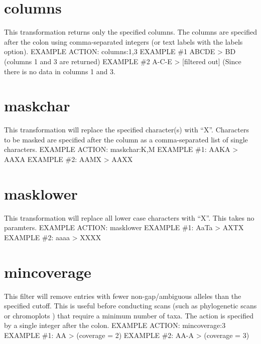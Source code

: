 \documentclass[letterpaper,11pt,english]{sphinxmanual}
\begin{document}
\section{columns}
\label{\detokenize{mvf_filter_modules:columns}}
This transformation returns only the specified columns.
The columns are specified after the colon using comma-separated integers
(or text labels with the \textendash{}labels option).
EXAMPLE ACTION: columns:1,3
EXAMPLE \#1 ABCDE \textendash{}\textgreater{} BD (columns 1 and 3 are returned)
EXAMPLE \#2 A-C-E \textendash{}\textgreater{} {[}filtered out{]} (Since there is no data in columns 1 and 3.


\section{maskchar}
\label{\detokenize{mvf_filter_modules:maskchar}}
This transformation will replace the specified character(s) with “X”.
Characters to be masked are specified after the column
as a comma-separated list of single characters.
EXAMPLE ACTION: maskchar:K,M
EXAMPLE \#1: AAKA \textendash{}\textgreater{} AAXA
EXAMPLE \#2: AAMX \textendash{}\textgreater{} AAXX


\section{masklower}
\label{\detokenize{mvf_filter_modules:masklower}}
This transformation will replace all lower case characters with “X”.
This takes no paramters.
EXAMPLE ACTION: masklower
EXAMPLE \#1: AaTa \textendash{}\textgreater{} AXTX
EXAMPLE \#2: aaaa \textendash{}\textgreater{} XXXX


\section{mincoverage}
\label{\detokenize{mvf_filter_modules:mincoverage}}
This filter will remove entries with fewer non-gap/ambiguous alleles
than the specified cutoff. This is useful before conducting scans
(such as phylogenetic scans or chromoplots ) that require a minimum
number of taxa.  The action is specified by a single integer after
the colon.
EXAMPLE ACTION: mincoverage:3
EXAMPLE \#1: A\textendash{}A \textendash{}\textgreater{}  (coverage = 2)
EXAMPLE \#2: AA-A \textendash{}\textgreater{}  (coverage = 3)
\end{document}
